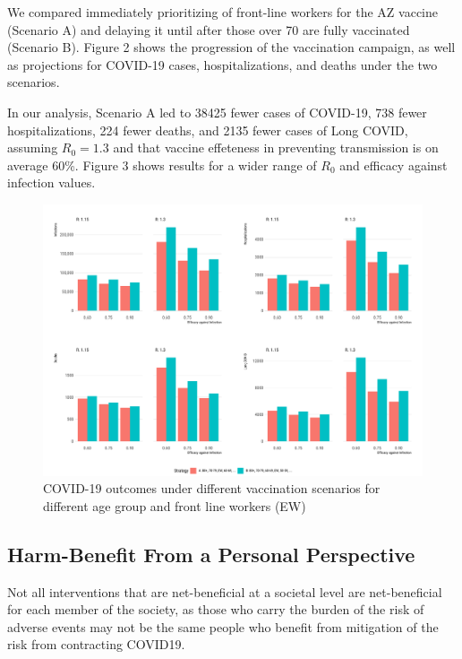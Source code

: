 \documentclass[]{interact}
\theoremstyle{plain}%
\theoremstyle{definition}
\theoremstyle{remark}
\begin{document}
We compared immediately prioritizing of front-line workers for the AZ
vaccine (Scenario A) and delaying it until after those over 70 are fully
vaccinated (Scenario B). Figure 2 shows the progression of the
vaccination campaign, as well as projections for COVID-19 cases,
hospitalizations, and deaths under the two scenarios.

In our analysis, Scenario A led to 38425 fewer cases of COVID-19, 738
fewer hospitalizations, 224 fewer deaths, and 2135 fewer cases of Long
COVID, assuming \(R_0=1.3\) and that vaccine effeteness in preventing
transmission is on average 60\%. Figure 3 shows results for a wider
range of \(R_0\) and efficacy against infection values.

\begin{figure}

{\centering \includegraphics[width=1\linewidth]{../figures/fig-barplots} 

}

\caption{COVID-19 outcomes under different vaccination scenarios for different age group and front line workers (EW)}\label{fig:fig2}
\end{figure}

\hypertarget{harm-benefit-from-a-personal-perspective}{%
\subsection{Harm-Benefit From a Personal
Perspective}\label{harm-benefit-from-a-personal-perspective}}

Not all interventions that are net-beneficial at a societal level are
net-beneficial for each member of the society, as those who carry the
burden of the risk of adverse events may not be the same people who
benefit from mitigation of the risk from contracting COVID19.
\end{document}
